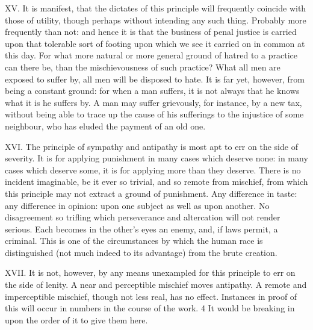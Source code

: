 \documentclass[12pt]{report}
\begin{document}
XV. It is manifest, that the dictates of this principle will frequently
coincide with those of utility, though perhaps without intending any
such thing. Probably more frequently than not: and hence it is that the
business of penal justice is carried upon that tolerable sort of footing
upon which we see it carried on in common at this day. For what more
natural or more general ground of hatred to a practice can there be,
than the mischievousness of such practice? What all men are exposed to
suffer by, all men will be disposed to hate. It is far yet, however,
from being a constant ground: for when a man suffers, it is not always
that he knows what it is he suffers by. A man may suffer grievously, for
instance, by a new tax, without being able to trace up the cause of his
sufferings to the injustice of some neighbour, who has eluded the
payment of an old one.

XVI. The principle of sympathy and antipathy is most apt to err on the
side of severity. It is for applying punishment in many cases which
deserve none: in many cases which deserve some, it is for applying more
than they deserve. There is no incident imaginable, be it ever so
trivial, and so remote from mischief, from which this principle may not
extract a ground of punishment. Any difference in taste: any difference
in opinion: upon one subject as well as upon another. No disagreement so
trifling which perseverance and altercation will not render serious.
Each becomes in the other's eyes an enemy, and, if laws permit, a
criminal. This is one of the circumstances by which the human race is
distinguished (not much indeed to its advantage) from the brute
creation.

XVII. It is not, however, by any means unexampled for this principle to
err on the side of lenity. A near and perceptible mischief moves
antipathy. A remote and imperceptible mischief, though not less real,
has no effect. Instances in proof of this will occur in numbers in the
course of the work. 4 It would be breaking in upon the order of it to
give them here.
\end{document}
